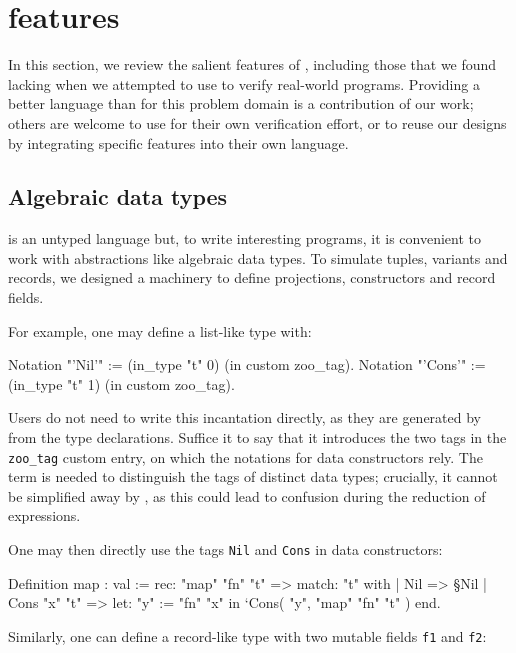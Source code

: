 \section{\Zoo features}
\label{sec:features}

In this section, we review the salient features of \Zoo, including those that we found lacking when we attempted to use \HeapLang to verify real-world \OCaml programs.
Providing a better \Iris language than \HeapLang for this problem domain is a contribution of our work; others are welcome to use \ZooLang for their own verification effort, or to reuse our designs by integrating specific features into their own \Iris language.

\subsection{Algebraic data types}

\ZooLang is an untyped language but, to write interesting programs, it is convenient to work with abstractions like algebraic data types.
To simulate tuples, variants and records, we designed a machinery to define projections, constructors and record fields.

For example, one may define a list-like type with:

\begin{coqcode}
Notation "'Nil'"  := (in_type "t" 0) (in custom zoo_tag).
Notation "'Cons'" := (in_type "t" 1) (in custom zoo_tag).
\end{coqcode}

Users do not need to write this incantation directly, as they are generated by \ocamlToZoo from the \OCaml type declarations.
Suffice it to say that it introduces the two tags in the \texttt{zoo\_tag} custom entry, on which the notations for data constructors rely.
The  term is needed to distinguish the tags of distinct data types; crucially, it cannot be simplified away by \Rocq, as this could lead to confusion during the reduction of expressions.

One may then directly use the tags \texttt{Nil} and \texttt{Cons} in data constructors:
\begin{coqcode}
Definition map : val := rec: "map" "fn" "t" =>
  match: "t" with
  | Nil => §Nil
  | Cons "x" "t" =>
      let: "y" := "fn" "x" in
      ‘Cons( "y", "map" "fn" "t" )
  end.
\end{coqcode}

Similarly, one can define a record-like type with two mutable fields \texttt{f1} and \texttt{f2}:

